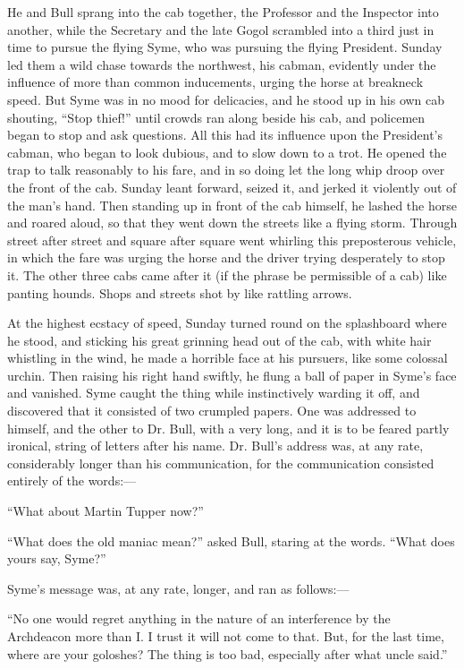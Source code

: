 He and Bull sprang into the cab together, the Professor and the Inspector into another, while the Secretary and the late Gogol scrambled into a third just in time to pursue the flying Syme, who was pursuing the flying President. Sunday led them a wild chase towards the northwest, his cabman, evidently under the influence of more than common inducements, urging the horse at breakneck speed. But Syme was in no mood for delicacies, and he stood up in his own cab shouting, “Stop thief!” until crowds ran along beside his cab, and policemen began to stop and ask questions. All this had its influence upon the President’s cabman, who began to look dubious, and to slow down to a trot. He opened the trap to talk reasonably to his fare, and in so doing let the long whip droop over the front of the cab. Sunday leant forward, seized it, and jerked it violently out of the man’s hand. Then standing up in front of the cab himself, he lashed the horse and roared aloud, so that they went down the streets like a flying storm. Through street after street and square after square went whirling this preposterous vehicle, in which the fare was urging the horse and the driver trying desperately to stop it. The other three cabs came after it (if the phrase be permissible of a cab) like panting hounds. Shops and streets shot by like rattling arrows.

At the highest ecstacy of speed, Sunday turned round on the splashboard where he stood, and sticking his great grinning head out of the cab, with white hair whistling in the wind, he made a horrible face at his pursuers, like some colossal urchin. Then raising his right hand swiftly, he flung a ball of paper in Syme’s face and vanished. Syme caught the thing while instinctively warding it off, and discovered that it consisted of two crumpled papers. One was addressed to himself, and the other to Dr. Bull, with a very long, and it is to be feared partly ironical, string of letters after his name. Dr. Bull’s address was, at any rate, considerably longer than his communication, for the communication consisted entirely of the words:⁠—

    “What about Martin Tupper now?”

“What does the old maniac mean?” asked Bull, staring at the words. “What does yours say, Syme?”

Syme’s message was, at any rate, longer, and ran as follows:⁠—

    “No one would regret anything in the nature of an interference by the Archdeacon more than I. I trust it will not come to that. But, for the last time, where are your goloshes? The thing is too bad, especially after what uncle said.”

